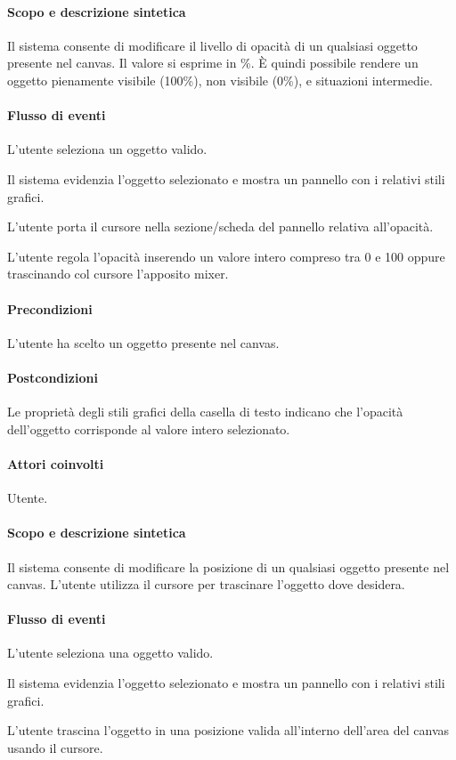 \paragraph{Scopo e descrizione sintetica}  Il sistema consente di modificare il livello di opacit\` a di un qualsiasi oggetto presente nel canvas. Il valore si esprime in \%.   \` E quindi possibile rendere un oggetto pienamente visibile (100\%), non visibile (0\%), e situazioni intermedie.
\paragraph{Flusso di eventi}
\begin{elenconumerato}[\textbf{}]{\subsubsecindent}
\item L'utente seleziona un oggetto valido.
\item Il sistema evidenzia l'oggetto selezionato e mostra un pannello con i relativi stili grafici.
\item L'utente porta  il cursore nella sezione/scheda del pannello relativa all'opacit\` a.
\item L'utente regola l'opacit\` a inserendo un valore intero compreso tra 0 e 100 oppure trascinando col cursore l'apposito mixer.
\end{elenconumerato}
\paragraph{Precondizioni} L'utente ha scelto un oggetto presente nel canvas.
\paragraph{Postcondizioni} Le propriet\` a degli stili grafici della casella di testo indicano che l'opacit\` a dell'oggetto corrisponde al valore intero selezionato.

\paragraph{Attori coinvolti} Utente.
\paragraph{Scopo e descrizione sintetica} Il sistema consente di modificare la posizione di un qualsiasi oggetto presente nel canvas. L'utente utilizza il cursore per trascinare l'oggetto dove desidera.
\paragraph{Flusso di eventi}
\begin{elenconumerato}[\textbf{}]{\subsubsecindent}
\item L'utente seleziona una oggetto valido.
\item Il sistema evidenzia l'oggetto selezionato e mostra un pannello con i relativi stili grafici.
\item L'utente trascina l'oggetto in una posizione valida all'interno dell'area del canvas usando il cursore.
\end{elenconumerato}
